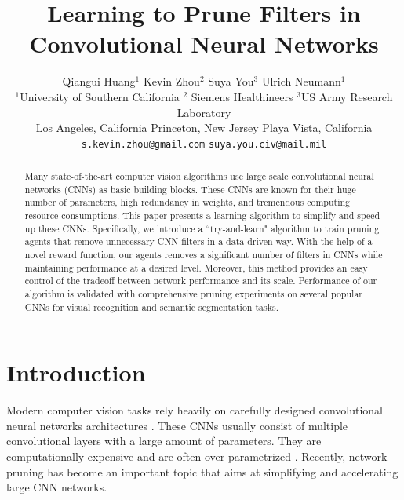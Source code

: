 \documentclass[10pt,twocolumn,letterpaper]{article}
\begin{document}
\title{Learning to Prune Filters in Convolutional Neural Networks}


\author{Qiangui Huang$^1$
 \qquad Kevin Zhou$^2$ \qquad Suya You$^3$ \qquad Ulrich Neumann$^1$\\
$^1$University of Southern California \hspace{5mm}  $^2$ Siemens Healthineers \hspace{5mm}  $^3$US Army Research Laboratory\\
\hspace{2mm}Los Angeles, California \hspace{12mm} Princeton, New Jersey \hspace{10mm} Playa Vista, California\\
\hspace{10mm}  {\tt\small s.kevin.zhou@gmail.com}\hspace{10mm}  {\tt\small suya.you.civ@mail.mil}\qquad
}


\maketitle
\ifwacvfinal\thispagestyle{empty}\fi

\begin{abstract}
Many state-of-the-art computer vision algorithms use large scale convolutional neural networks (CNNs) as basic building blocks. These CNNs are known for their huge number of parameters, high redundancy in weights, and tremendous computing resource consumptions. This paper presents a learning algorithm to simplify and speed up these CNNs. Specifically, we introduce a ``try-and-learn" algorithm to train pruning agents that remove unnecessary CNN filters in a data-driven way. With the help of a novel reward function, our agents removes a significant number of filters in CNNs while maintaining performance at a desired level. Moreover, this method provides an easy control of the tradeoff between network performance and its scale. Performance of our algorithm is validated with comprehensive pruning experiments on several popular CNNs for visual recognition and semantic segmentation tasks. 
\end{abstract}




\section{Introduction}
Modern computer vision tasks rely heavily on carefully designed convolutional neural networks architectures \cite{alexnet, vgg, googlenet, resnet}. These CNNs usually consist of multiple convolutional layers with a large amount of parameters. They are computationally expensive and are often over-parametrized \cite{ppdl}. Recently, network pruning has become an important topic that aims at simplifying and accelerating large CNN networks.
\end{document}
